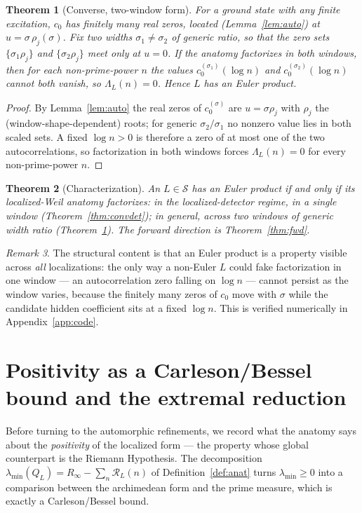 \documentclass[11pt]{amsart}
\newtheorem{theorem}{Theorem}[section]
\theoremstyle{definition}
\theoremstyle{remark}
\newtheorem{remark}[theorem]{Remark}
\newcommand{\cR}{\mathcal R}
\newcommand{\cS}{\mathcal S}
\begin{document}
\begin{theorem}[Converse, two-window form]\label{thm:conv2}
For a ground state with any finite excitation, $c_0$ has finitely many real
zeros, located (Lemma~\ref{lem:auto}) at $u=\sigma\,\rho_j(\sigma)$. Fix two
widths $\sigma_1\ne\sigma_2$ of generic ratio, so that the zero sets
$\{\sigma_1\rho_j\}$ and $\{\sigma_2\rho_j\}$ meet only at $u=0$. If the anatomy
factorizes in both windows, then for each non-prime-power $n$ the values
$c_0^{(\sigma_1)}(\log n)$ and $c_0^{(\sigma_2)}(\log n)$ cannot both vanish, so
$\Lambda_L(n)=0$. Hence $L$ has an Euler product.
\end{theorem}
\begin{proof}
By Lemma~\ref{lem:auto} the real zeros of $c_0^{(\sigma)}$ are $u=\sigma\rho_j$
with $\rho_j$ the (window-shape-dependent) roots; for generic $\sigma_2/\sigma_1$
no nonzero value lies in both scaled sets. A fixed $\log n>0$ is therefore a zero
of at most one of the two autocorrelations, so factorization in both windows
forces $\Lambda_L(n)=0$ for every non-prime-power $n$.
\end{proof}

\begin{theorem}[Characterization]\label{thm:char}
An $L\in\cS$ has an Euler product if and only if its localized-Weil anatomy
factorizes: in the localized-detector regime, in a single window
(Theorem~\ref{thm:convdet}); in general, across two windows of generic width
ratio (Theorem~\ref{thm:conv2}). The forward direction is
Theorem~\ref{thm:fwd}.
\end{theorem}

\begin{remark}
The structural content is that an Euler product is a property visible across
\emph{all} localizations: the only way a non-Euler $L$ could fake factorization
in one window --- an autocorrelation zero falling on $\log n$ --- cannot persist
as the window varies, because the finitely many zeros of $c_0$ move with
$\sigma$ while the candidate hidden coefficient sits at a fixed $\log n$. This is
verified numerically in Appendix~\ref{app:code}.
\end{remark}

\section{Positivity as a Carleson/Bessel bound and the extremal reduction}
\label{sec:carleson}

Before turning to the automorphic refinements, we record what the anatomy says
about the \emph{positivity} of the localized form --- the property whose global
counterpart is the Riemann Hypothesis. The decomposition $\lambda_{\min}(Q_L)=
R_\infty-\sum_{n}\cR_L(n)$ of Definition~\ref{def:anat} turns $\lambda_{\min}\ge0$
into a comparison between the archimedean form and the prime measure, which is
exactly a Carleson/Bessel bound.
\end{document}
